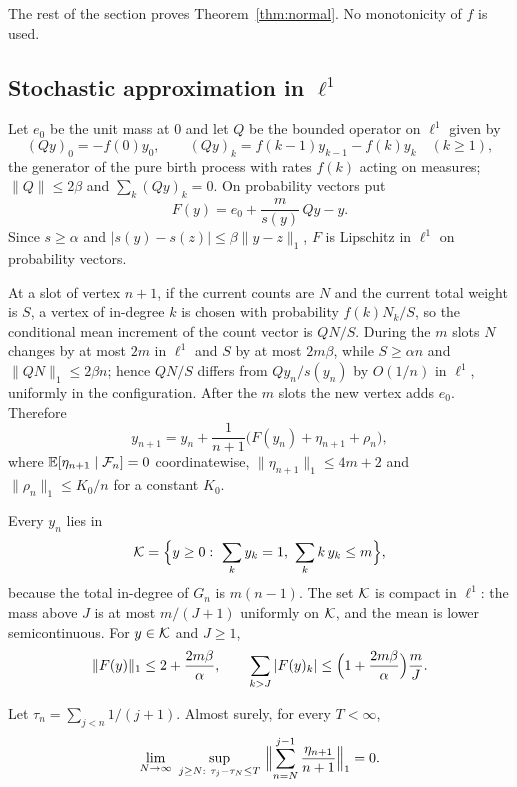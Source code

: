 The rest of the section proves Theorem~\ref{thm:normal}. No monotonicity of $f$ is used.

\subsection{Stochastic approximation in $\ell^1$}

Let $e_0$ be the unit mass at $0$ and let $Q$ be the bounded operator on $\ell^1$ given by
\[
  (Qy)_0=-f(0)y_0,\qquad (Qy)_k=f(k-1)y_{k-1}-f(k)y_k\quad(k\ge1),
\]
the generator of the pure birth process with rates $f(k)$ acting on measures; $\|Q\|\le2\beta$ and
$\sum_k(Qy)_k=0$. On probability vectors put
\[
   F(y)=e_0+\frac{m}{s(y)}\,Qy-y .
\]
Since $s\ge\alpha$ and $|s(y)-s(z)|\le\beta\|y-z\|_1$, $F$ is Lipschitz in $\ell^1$ on probability vectors.

At a slot of vertex $n+1$, if the current counts are $N$ and the current total weight is $S$, a vertex of
in-degree $k$ is chosen with probability $f(k)N_k/S$, so the conditional mean increment of the count vector is
$QN/S$. During the $m$ slots $N$ changes by at most $2m$ in $\ell^1$ and $S$ by at most $2m\beta$, while
$S\ge\alpha n$ and $\|QN\|_1\le2\beta n$; hence $QN/S$ differs from $Qy_n/s(y_n)$ by $O(1/n)$ in $\ell^1$,
uniformly in the configuration. After the $m$ slots the new vertex adds $e_0$. Therefore
\begin{equation}\label{eq:sa}
   y_{n+1}=y_n+\frac{1}{n+1}\bigl(F(y_n)+\eta_{n+1}+\rho_n\bigr),
\end{equation}
where $\mathbb{E}[\eta_{n+1}\mid\mathcal{F}_n]=0$ coordinatewise, $\|\eta_{n+1}\|_1\le4m+2$ and $\|\rho_n\|_1\le K_0/n$ for a
constant $K_0$.

Every $y_n$ lies in
\[
   \cK=\Bigl\{y\ge0:\ \sum_ky_k=1,\ \sum_kk\,y_k\le m\Bigr\},
\]
because the total in-degree of $G_n$ is $m(n-1)$. The set $\mathcal{K}$ is compact in $\ell^1$: the mass above $J$ is at
most $m/(J+1)$ uniformly on $\mathcal{K}$, and the mean is lower semicontinuous. For $y\in\mathcal{K}$ and $J\ge1$,
\begin{equation}\label{eq:Ftail}
   \|F(y)\|_1\le2+\frac{2m\beta}{\alpha},\qquad \sum_{k>J}|F(y)_k|\le\Bigl(1+\frac{2m\beta}{\alpha}\Bigr)\frac mJ .
\end{equation}

\begin{lemma}[Noise]\label{lem:noise}
Let $\tau_n=\sum_{j<n}1/(j+1)$. Almost surely, for every $T<\infty$,
\[
   \lim_{N\to\infty}\ \sup_{j\ge N:\ \tau_j-\tau_N\le T}\ \Bigl\|\sum_{n=N}^{j-1}\frac{\eta_{n+1}}{n+1}\Bigr\|_1=0 .
\]
\end{lemma}


